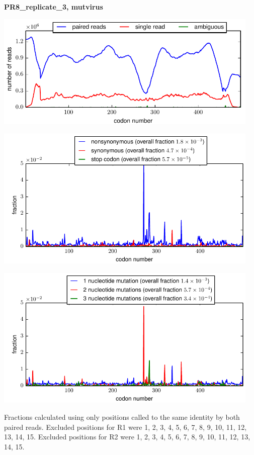\documentclass[10pt,letterpaper]{article}
\begin{document}
\centerline{\Large \bf PR8\_replicate\_3, mutvirus}
\vspace{0.1in}

\centerline{\includegraphics[width=5in]{PR8_replicate_3_mutvirus_codondepth.pdf}}
\vspace{0.1in}

\centerline{\includegraphics[width=5in]{PR8_replicate_3_mutvirus_syn-ns-dist.pdf}}
\vspace{0.1in}

\centerline{\includegraphics[width=5in]{PR8_replicate_3_mutvirus_nmutspercodon-dist.pdf}}
\vspace{0.1in}

Fractions calculated using only positions called to the same identity by both paired reads.  Excluded positions for R1 were 1, 2, 3, 4, 5, 6, 7, 8, 9, 10, 11, 12, 13, 14, 15. 
 Excluded positions for R2 were 1, 2, 3, 4, 5, 6, 7, 8, 9, 10, 11, 12, 13, 14, 15. 
\end{document}
